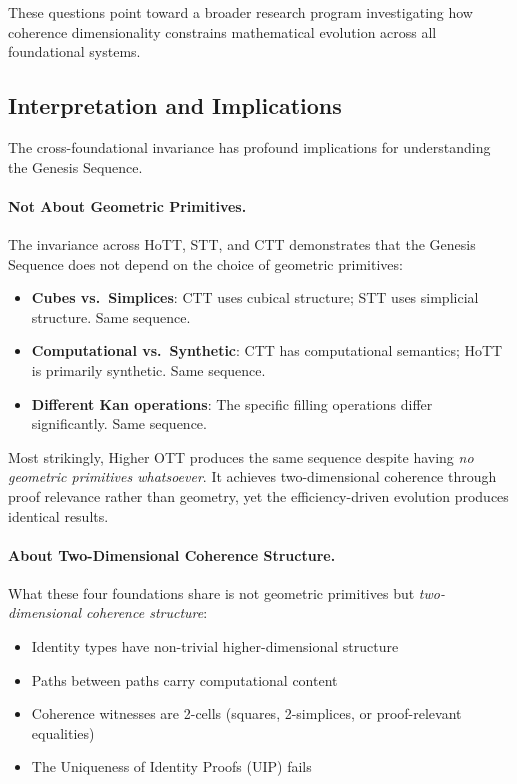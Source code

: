 \documentclass[11pt]{article}
\theoremstyle{definition}
\theoremstyle{remark}
\begin{document}
These questions point toward a broader research program investigating how coherence dimensionality constrains mathematical evolution across all foundational systems.

\subsection{Interpretation and Implications}

The cross-foundational invariance has profound implications for understanding the Genesis Sequence.

\paragraph{Not About Geometric Primitives.}

The invariance across HoTT, STT, and CTT demonstrates that the Genesis Sequence does not depend on the choice of geometric primitives:
\begin{itemize}
\item \textbf{Cubes vs.\ Simplices}: CTT uses cubical structure; STT uses simplicial structure. Same sequence.
\item \textbf{Computational vs.\ Synthetic}: CTT has computational semantics; HoTT is primarily synthetic. Same sequence.
\item \textbf{Different Kan operations}: The specific filling operations differ significantly. Same sequence.
\end{itemize}

Most strikingly, Higher OTT produces the same sequence despite having \emph{no geometric primitives whatsoever}. It achieves two-dimensional coherence through proof relevance rather than geometry, yet the efficiency-driven evolution produces identical results.

\paragraph{About Two-Dimensional Coherence Structure.}

What these four foundations share is not geometric primitives but \emph{two-dimensional coherence structure}:
\begin{itemize}
\item Identity types have non-trivial higher-dimensional structure
\item Paths between paths carry computational content
\item Coherence witnesses are 2-cells (squares, 2-simplices, or proof-relevant equalities)
\item The Uniqueness of Identity Proofs (UIP) fails
\end{itemize}
\end{document}

